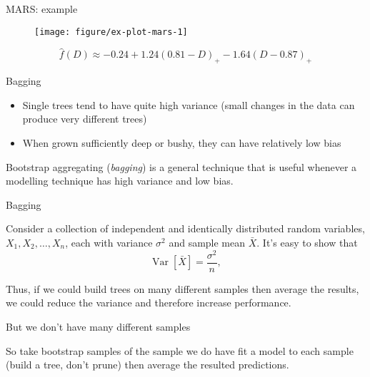 \documentclass[handout]{beamer}
\begin{document}
\begin{frame}[t]{MARS: example}

\begin{figure}[!htbp]
\begin{center}
  \texttt{[image: figure/ex-plot-mars-1]}
\end{center}
\end{figure}
%
\begin{equation*}
  \label{eq:mars-eqn}
  \hat{f}(D) \approx -0.24 + 1.24 (0.81 - D)_{+} -1.64 (D - 0.87)_{+}
\end{equation*}

\end{frame}

\begin{frame}{Bagging}
  
  \begin{itemize}
    \item Single trees tend to have quite high variance (small changes in the data can produce very different trees)
    \item When grown sufficiently deep or bushy, they can have relatively low bias 
  \end{itemize}
  
  Bootstrap aggregating (\emph{bagging}) is a general technique that is useful whenever a modelling technique has high variance and low bias.
  
\end{frame}

\begin{frame}{Bagging}
  
  Consider a collection of independent and identically distributed random variables, $X_{1}, X_{2}, \ldots, X_{n}$, each with variance $\sigma^2$ and sample mean $\bar{X}$. It's easy to show that
  \begin{equation*}
    \operatorname{Var}[\bar{X}] = \frac{\sigma^2}{n},
  \end{equation*}
  
  Thus, if we could build trees on many different samples then average the results, we could reduce the variance and therefore increase performance.
  
  But we don't have many different samples
  
  So take bootstrap samples of the sample we do have
  fit a model to each sample 
  (build a tree, don't prune) 
  then average the resulted predictions.
  
\end{frame}
\end{document}
